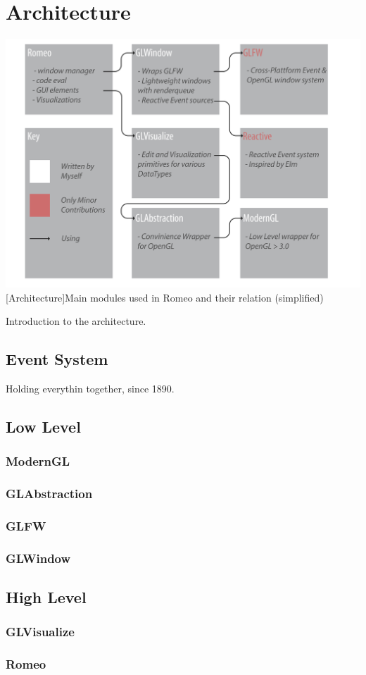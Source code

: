 \section{Architecture}

\vspace{1em}
\begin{minipage}{\linewidth}
    \centering
    \includegraphics[width=0.9\linewidth]{graphics/architecture.pdf}
    [Architecture]{Main modules used in Romeo and their relation (simplified)}
    \label{fig:architecture} 
\end{minipage}
Introduction to the architecture.

\subsection{Event System}
Holding everythin together, since 1890.
\subsection{Low Level}

\subsubsection{ModernGL}
\subsubsection{GLAbstraction}

\subsubsection{GLFW}
\subsubsection{GLWindow}

\subsection{High Level}

\subsubsection{GLVisualize}
\subsubsection{Romeo}
